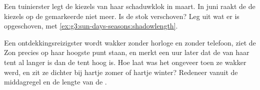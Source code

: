 \begin{exercise}[$\star\star$]\label{exo:g3:sun-days-seasons:10}
Een tuinierster legt de kiezels van haar schaduwklok in maart. In juni
raakt de  de kiezels op de gemarkeerde  niet meer. Is de
stok verschoven? Leg uit wat er is opgeschoven, met
\cref{ex:g3:sun-days-seasons:shadowlength}.
\end{exercise}

\begin{exercise}[$\star\star$]\label{exo:g3:sun-days-seasons:11}
Een ontdekkingsreizigster wordt wakker zonder horloge en zonder
telefoon, ziet de Zon precies op haar hoogste punt staan, en merkt een
uur later dat de  van haar tent al langer is dan de tent hoog
is. Hoe laat was het ongeveer toen ze wakker werd, en zit ze dichter
bij hartje zomer of hartje winter? Redeneer vanuit de middagregel en
de lengte van de .
\end{exercise}
